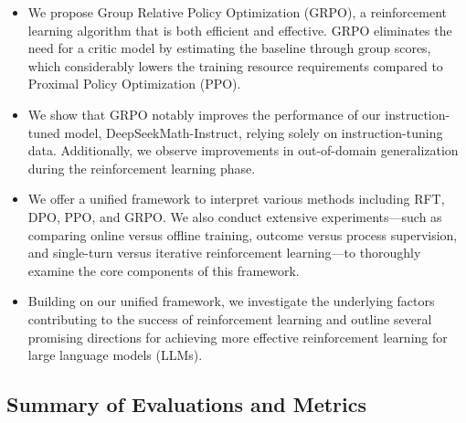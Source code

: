 \begin{itemize}[topsep=0pt]
    \item We propose Group Relative Policy Optimization (GRPO), a reinforcement learning algorithm that is both efficient and effective. GRPO eliminates the need for a critic model by estimating the baseline through group scores, which considerably lowers the training resource requirements compared to Proximal Policy Optimization (PPO).
    \item We show that GRPO notably improves the performance of our instruction-tuned model, DeepSeekMath-Instruct, relying solely on instruction-tuning data. Additionally, we observe improvements in out-of-domain generalization during the reinforcement learning phase.
    \item We offer a unified framework to interpret various methods including RFT, DPO, PPO, and GRPO. We also conduct extensive experiments—such as comparing online versus offline training, outcome versus process supervision, and single-turn versus iterative reinforcement learning—to thoroughly examine the core components of this framework.
    \item Building on our unified framework, we investigate the underlying factors contributing to the success of reinforcement learning and outline several promising directions for achieving more effective reinforcement learning for large language models (LLMs).
\end{itemize}

\subsection{Summary of Evaluations and Metrics}

